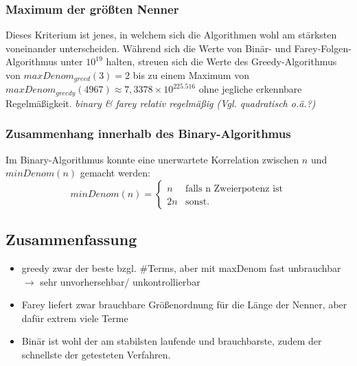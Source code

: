 \subsubsection{Maximum der größten Nenner}
Dieses Kriterium ist jenes, in welchem sich die Algorithmen wohl am stärksten voneinander unterscheiden. Während sich die Werte von Binär- und Farey-Folgen-Algorithmus unter $10^{19}$ halten, streuen sich die Werte des Greedy-Algorithmus von $maxDenom_{greed}(3) = 2$ bis zu einem Maximum von $maxDenom_{greedy}(4967) \approx 7,3378 \times 10^{225.516}$ ohne jegliche erkennbare Regelmäßigkeit. \emph{binary \& farey relativ regelmäßig (Vgl. quadratisch o.ä.?)}
\subsubsection{Zusammenhang innerhalb des Binary-Algorithmus}
Im Binary-Algorithmus konnte eine unerwartete Korrelation zwischen $n$ und $minDenom(n)$ gemacht werden:
\begin{equation*}
	minDenom(n) = 
	\begin{cases}
		n & \text{falls n Zweierpotenz ist} \\
		2n & \text{sonst.}
	\end{cases}
\end{equation*}

\subsection{Zusammenfassung}
\begin{itemize}
	\item greedy zwar der beste bzgl. \#Terms, aber mit maxDenom fast unbrauchbar $\rightarrow$ sehr unvorhersehbar/ unkontrollierbar
	\item Farey liefert zwar brauchbare Größenordnung für die Länge der Nenner, aber dafür extrem viele Terme
	\item Binär ist wohl der am stabilsten laufende und brauchbarste, zudem der schnellste der getesteten Verfahren.
\end{itemize}
